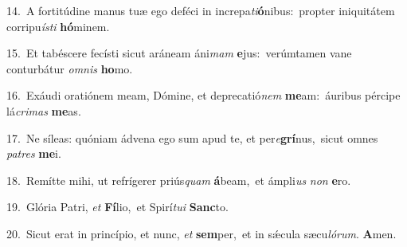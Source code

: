 {\numbfont\textcolor{\numbcolor}{14.}}~A fortitúdine manus tuæ ego deféci in increpa\-\textit{ti}\-\textbf{ó}nibus:~\star propter iniquitátem corripu\-\textit{ís}\-\textit{ti} \textbf{hó}\-minem.\par
{\numbfont\textcolor{\numbcolor}{15.}}~Et tabéscere fecísti sicut aráneam áni\textit{mam} \textbf{e}\-jus:~\star verúmtamen vane conturbátur \textit{om}\-\textit{nis} \textbf{ho}\-mo.\par
{\numbfont\textcolor{\numbcolor}{16.}}~Exáudi oratiónem meam, Dómine, et deprecatió\textit{nem} \textbf{me}\-am:~\star áuribus pércipe lá\-\textit{cri}\-\textit{mas} \textbf{me}\-as.\par
{\numbfont\textcolor{\numbcolor}{17.}}~Ne síleas: quóniam ádvena ego sum apud te, et per\-\textit{e}\-\textbf{grí}nus,~\star sicut omnes \textit{pa}\-\textit{tres} \textbf{me}\-i.\par
{\numbfont\textcolor{\numbcolor}{18.}}~Remítte mihi, ut refrígerer priús\textit{quam} \textbf{á}\-beam,~\star et ámpli\textit{us} \textit{non} \textbf{e}\-ro.\par
{\numbfont\textcolor{\numbcolor}{19.}}~Glória Patri, \textit{et} \textbf{Fí}\-lio,~\star et Spirí\-\textit{tu}\-\textit{i} \textbf{Sanc}\-to.\par
{\numbfont\textcolor{\numbcolor}{20.}}~Sicut erat in princípio, et nunc, \textit{et} \textbf{sem}\-per,~\star et in sǽcula sæcu\-\textit{ló}\-\textit{rum}. \textbf{A}\-men.\par
